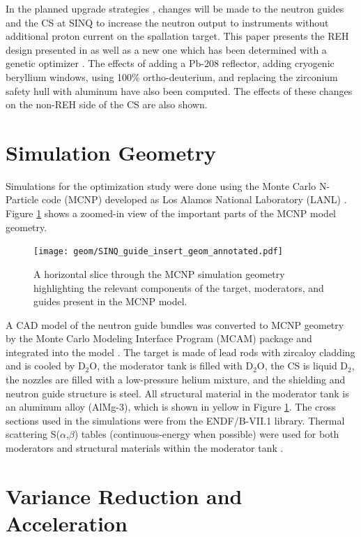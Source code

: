 \documentclass[a4paper]{jpconf}
\begin{document}
In the planned upgrade strategies \cite{rueegg_icans}, changes will be made to the neutron guides and the CS at SINQ to increase the neutron output to instruments without additional proton current on the spallation target.  This paper presents the REH design presented in \cite{ecns} as well as a new one which has been determined with a genetic optimizer \cite{deap}.   The effects of adding a Pb-208 reflector, adding cryogenic beryllium windows, using 100\% ortho-deuterium, and replacing the zirconium safety hull with aluminum have also been computed.  The effects of these changes on the non-REH side of the CS are also shown.


\section{Simulation Geometry}

Simulations for the optimization study were done using the Monte Carlo N-Particle code (MCNP) developed as Los Alamos National Laboratory (LANL) \cite{mcnp6}.  Figure \ref{geom} shows a zoomed-in view of the important parts of the MCNP model geometry.  

\begin{figure}[h!]
\begin{center}
\texttt{[image: geom/SINQ\_guide\_insert\_geom\_annotated.pdf]}
\end{center}
\caption{\label{geom}A horizontal slice through the MCNP simulation geometry highlighting the relevant components of the target, moderators, and guides present in the MCNP model.}
\end{figure}

A CAD model of the neutron guide bundles was converted to MCNP geometry by the Monte Carlo Modeling Interface Program (MCAM) package and integrated into the model \cite{mcam}.  The target is made of lead rods with zircaloy cladding and is cooled by D$_2$O, the moderator tank is filled with D$_2$O, the CS is liquid D$_2$, the nozzles are filled with a low-pressure helium mixture, and the shielding and neutron guide structure is steel.  All structural material in the moderator tank is an aluminum alloy (AlMg-3), which is shown in yellow in Figure \ref{geom}.  The cross sections used in the simulations were from the ENDF/B-VII.1 library.  Thermal scattering S($\alpha$,$\beta$) tables (continuous-energy when possible) were used for both moderators and structural materials within the moderator tank \cite{sab, ike}.

\section{Variance Reduction and Acceleration}
\end{document}
